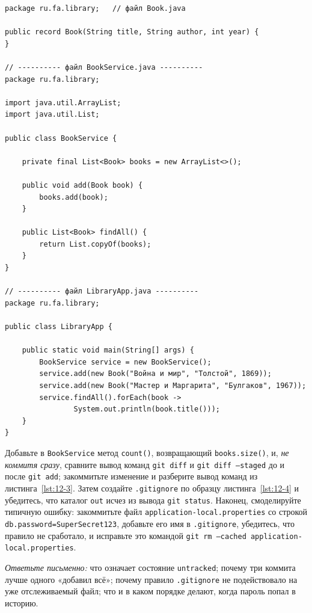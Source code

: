 \begin{listing}[H]
\begin{verbatim}
package ru.fa.library;   // файл Book.java

public record Book(String title, String author, int year) {
}

// ---------- файл BookService.java ----------
package ru.fa.library;

import java.util.ArrayList;
import java.util.List;

public class BookService {

    private final List<Book> books = new ArrayList<>();

    public void add(Book book) {
        books.add(book);
    }

    public List<Book> findAll() {
        return List.copyOf(books);
    }
}

// ---------- файл LibraryApp.java ----------
package ru.fa.library;

public class LibraryApp {

    public static void main(String[] args) {
        BookService service = new BookService();
        service.add(new Book("Война и мир", "Толстой", 1869));
        service.add(new Book("Мастер и Маргарита", "Булгаков", 1967));
        service.findAll().forEach(book ->
                System.out.println(book.title()));
    }
}
\end{verbatim}
\caption{Классы учебного проекта}
\label{lst:12-15}
\end{listing}

Добавьте в \texttt{BookService} метод \texttt{count()}, возвращающий \texttt{books.size()}, и, \emph{не коммитя сразу}, сравните вывод команд \texttt{git diff} и \texttt{git diff --staged} до и после \texttt{git add}; закоммитьте изменение и разберите вывод команд из листинга~\ref{lst:12-3}. Затем создайте \texttt{.gitignore} по образцу листинга~\ref{lst:12-4} и убедитесь, что каталог \texttt{out} исчез из вывода \texttt{git status}. Наконец, смоделируйте типичную ошибку: закоммитьте файл \texttt{application-local.properties} со строкой \texttt{db.password=SuperSecret123}, добавьте его имя в \texttt{.gitignore}, убедитесь, что правило не сработало, и исправьте это командой \texttt{git rm --cached application-local.properties}.

\emph{Ответьте письменно:} что означает состояние \texttt{untracked}; почему три коммита лучше одного «добавил всё»; почему правило \texttt{.gitignore} не подействовало на уже отслеживаемый файл; что и в каком порядке делают, когда пароль попал в историю.

